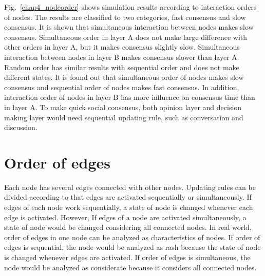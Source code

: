 Fig.~\ref{chap4_nodeorder} shows simulation results according to interaction orders of nodes. The results are classified to two categories, fast consensus and slow consensus. It is shown that simultaneous interaction between nodes makes slow consensus. Simultaneous order in layer A does not make large difference with other orders in layer A, but it makes consensus slightly slow. Simultaneous interaction between nodes in layer B makes consensus slower than layer A. Random order has similar results with sequential order and does not make different states. It is found out that simultaneous order of nodes makes slow consensus and sequential order of nodes makes fast consensus. In addition, interaction order of nodes in layer B has more influence on consensus time than in layer A. To make quick social consensus, both opinion layer and decision making layer would need sequential updating rule, such as conversation and discussion.      

\section{Order of edges}
Each node has several edges connected with other nodes. Updating rules can be divided according to that edges are activated sequentially or simultaneously. If edges of each node work sequentially, a state of node is changed whenever each edge is activated. However, If edges of a node are activated simultaneously, a state of node would be changed considering all connected nodes. In real world, order of edges in one node can be analyzed as characteristics of nodes. If order of edges is sequential, the node would be analyzed as rash because the state of node is changed whenever edges are activated. If order of edges is simultaneous, the node would be analyzed as considerate because it considers all connected nodes. 

